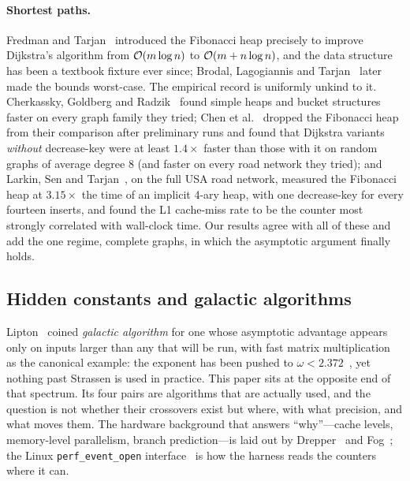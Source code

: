 \paragraph{Shortest paths.}
Fredman and Tarjan~\cite{fredman1987fibonacci} introduced the Fibonacci heap
precisely to improve Dijkstra's algorithm from $\mathcal{O}(m\log n)$ to
$\mathcal{O}(m+n\log n)$, and the data structure has been a textbook fixture ever
since; Brodal, Lagogiannis and Tarjan~\cite{brodal2012strict} later made the
bounds worst-case. The empirical record is uniformly unkind to it. Cherkassky,
Goldberg and Radzik~\cite{cherkassky1996shortest} found simple heaps and bucket
structures faster on every graph family they tried; Chen et
al.~\cite{chen2007priority} dropped the Fibonacci heap from their comparison
after preliminary runs and found that Dijkstra variants \emph{without}
decrease-key were at least $1.4\times$ faster than those with it on random
graphs of average degree 8 (and faster on every road network they tried); and
Larkin, Sen and Tarjan~\cite{larkin2014backtobasics}, on the full USA road
network, measured the Fibonacci heap at $3.15\times$ the time of an implicit
4-ary heap, with one decrease-key for every fourteen inserts, and found the L1
cache-miss rate to be the counter most strongly correlated with wall-clock
time. Our results
agree with all of these and add the one regime, complete graphs, in which the
asymptotic argument finally holds.

\subsection{Hidden constants and galactic algorithms}
Lipton~\cite{lipton2010galactic} coined \emph{galactic algorithm} for
one whose asymptotic advantage appears only on inputs larger than any that
will be run, with fast matrix multiplication as the canonical example: the
exponent has been pushed to $\omega<2.372$~\cite{alman2024refined,
alman2024asymmetry}, yet nothing past Strassen is used in practice. This paper
sits at the opposite end of that spectrum. Its four pairs are algorithms that
are actually used, and the question is not whether their crossovers exist but
where, with what precision, and what moves them. The hardware background that
answers ``why''---cache levels, memory-level parallelism, branch
prediction---is laid out by Drepper~\cite{drepper2007memory} and Fog~\cite{fog2026optimizing}; the
Linux \texttt{perf\_event\_open} interface~\cite{linux2026perfeventopen} is
how the harness reads the counters where it can.

